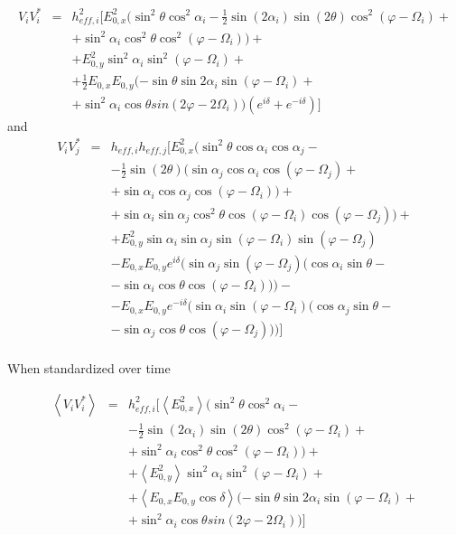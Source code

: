 \documentclass[a4paper,10pt]{thesis}
\begin{document}
\begin{eqnarray}
V_i V_i^{*} &=& h_{eff,i}^2[E_{0,x}^2 (\sin^2 \theta \cos^2 \alpha_i -\frac{1}{2} \sin (2\alpha_i) \sin(2\theta) \cos^2(\varphi - \Omega_i) + \nonumber \\
& & + \sin^2\alpha_i \cos^2\theta \cos^2(\varphi - \Omega_i))+ \\
& & + E_{0,y}^2 \sin^2\alpha_i \sin^2 (\varphi - \Omega_i) +\nonumber \\
& & +  \frac{1}{2} E_{0,x} E_{0,y} (-\sin \theta \sin 2\alpha_i \sin(\varphi - \Omega_i) + \nonumber \\
&&+\sin^2\alpha_i \cos \theta sin(2\varphi - 2\Omega_i)) (e^{i \delta} + e^{-i \delta } )]\nonumber
\end{eqnarray}
and
\begin{eqnarray}
V_i V_j^{*} &=& h_{eff,i} h_{eff,j}[E_{0,x}^2 (\sin^2 \theta \cos \alpha_i \cos \alpha_j - \\
& & - \frac{1}{2}  \sin(2\theta) (\sin \alpha_j \cos \alpha_i \cos(\varphi - \Omega_j)+ \nonumber \\
& & +\sin \alpha_i \cos \alpha_j \cos(\varphi - \Omega_i) )+ \nonumber \\
& & + \sin \alpha_i \sin \alpha_j \cos^2\theta \cos(\varphi - \Omega_i) \cos(\varphi - \Omega_j))+ \nonumber \\
& & + E_{0,y}^2 \sin \alpha_i \sin \alpha_j \sin (\varphi - \Omega_i) \sin (\varphi - \Omega_j)\nonumber \\
& & -E_{0,x} E_{0,y} e^{i \delta}( \sin \alpha_j \sin(\varphi - \Omega_j)( \cos \alpha_i \sin \theta - \nonumber \\
& &- \sin \alpha_i \cos \theta \cos(\varphi - \Omega_i)))-\nonumber \\
& &  -E_{0,x} E_{0,y} e^{-i \delta}( \sin \alpha_i \sin(\varphi - \Omega_i)( \cos \alpha_j \sin \theta - \nonumber \\
& & -\sin \alpha_j \cos \theta \cos(\varphi - \Omega_j)))]\nonumber
\end{eqnarray}

\paragraph*{}
When standardized over time

\begin{eqnarray}
\left\langle V_i V_i^{*} \right\rangle &=&  h_{eff,i}^2[\left\langle E_{0,x}^2\right\rangle (\sin^2 \theta \cos^2 \alpha_i -\nonumber\\
& & -\frac{1}{2} \sin (2\alpha_i) \sin(2\theta) \cos^2(\varphi - \Omega_i) + \\
& & + \sin^2\alpha_i \cos^2\theta \cos^2(\varphi - \Omega_i))+ \nonumber \\
& & + \left\langle E_{0,y}^2 \right\rangle \sin^2\alpha_i \sin^2 (\varphi - \Omega_i)+ \nonumber \\
& & +  \left\langle E_{0,x} E_{0,y} \cos \delta \right\rangle (-\sin \theta \sin 2\alpha_i \sin(\varphi - \Omega_i) + \nonumber \\
& &+ \sin^2\alpha_i \cos \theta sin(2\varphi - 2\Omega_i)) ]\nonumber
\end{eqnarray}
\end{document}
